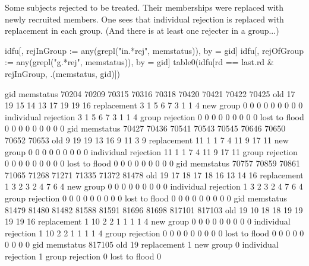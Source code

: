 	Some subjects rejected to be treated. Their memberships were replaced with newly recruited members. One sees that \textsf{individual rejection} is replaced with \textsf{replacement} in each group. (And there is at least one rejecter in a group...)
\begin{Schunk}
\begin{Sinput}
idfu[, rejInGroup := any(grepl("in.*rej", memstatus)), by = gid]
idfu[, rejOfGroup := any(grepl("g.*rej", memstatus)), by = gid]
table0(idfu[rd == last.rd & rejInGroup, .(memstatus, gid)])
\end{Sinput}
\begin{Soutput}
                      gid
memstatus              70204 70209 70315 70316 70318 70420 70421 70422 70425
  old                     17    19    15    14    13    17    19    19    16
  replacement              3     1     5     6     7     3     1     1     4
  new group                0     0     0     0     0     0     0     0     0
  individual rejection     3     1     5     6     7     3     1     1     4
  group rejection          0     0     0     0     0     0     0     0     0
  lost to flood            0     0     0     0     0     0     0     0     0
                      gid
memstatus              70427 70436 70541 70543 70545 70646 70650 70652 70653
  old                      9    19    19    13    16     9    11     3     9
  replacement             11     1     1     7     4    11     9    17    11
  new group                0     0     0     0     0     0     0     0     0
  individual rejection    11     1     1     7     4    11     9    17    11
  group rejection          0     0     0     0     0     0     0     0     0
  lost to flood            0     0     0     0     0     0     0     0     0
                      gid
memstatus              70757 70859 70861 71065 71268 71271 71335 71372 81478
  old                     19    17    18    17    18    16    13    14    16
  replacement              1     3     2     3     2     4     7     6     4
  new group                0     0     0     0     0     0     0     0     0
  individual rejection     1     3     2     3     2     4     7     6     4
  group rejection          0     0     0     0     0     0     0     0     0
  lost to flood            0     0     0     0     0     0     0     0     0
                      gid
memstatus              81479 81480 81482 81588 81591 81696 81698 817101 817103
  old                     19    10    18    18    19    19    19     19     16
  replacement              1    10     2     2     1     1     1      1      4
  new group                0     0     0     0     0     0     0      0      0
  individual rejection     1    10     2     2     1     1     1      1      4
  group rejection          0     0     0     0     0     0     0      0      0
  lost to flood            0     0     0     0     0     0     0      0      0
                      gid
memstatus              817105
  old                      19
  replacement               1
  new group                 0
  individual rejection      1
  group rejection           0
  lost to flood             0
\end{Soutput}
\end{Schunk}
